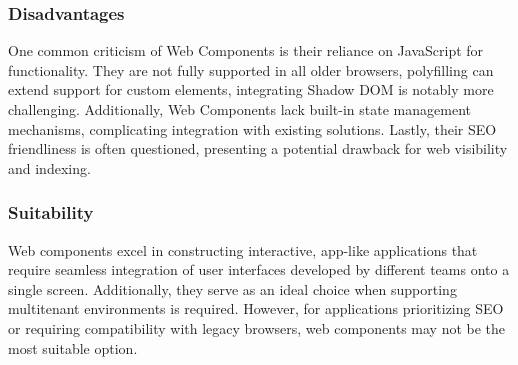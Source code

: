 \subsubsection{Disadvantages}
One common criticism of Web Components is their reliance on JavaScript for functionality. They are not fully supported in all older browsers, polyfilling can extend support for custom elements, integrating Shadow DOM is notably more challenging. Additionally, Web Components lack built-in state management mechanisms, complicating integration with existing solutions. Lastly, their SEO friendliness is often questioned, presenting a potential drawback for web visibility and indexing.

\subsubsection{Suitability}
Web components excel in constructing interactive, app-like applications that require seamless integration of user interfaces developed by different teams onto a single screen. Additionally, they serve as an ideal choice when supporting multitenant environments is required. However, for applications prioritizing SEO or requiring compatibility with legacy browsers, web components may not be the most suitable option.